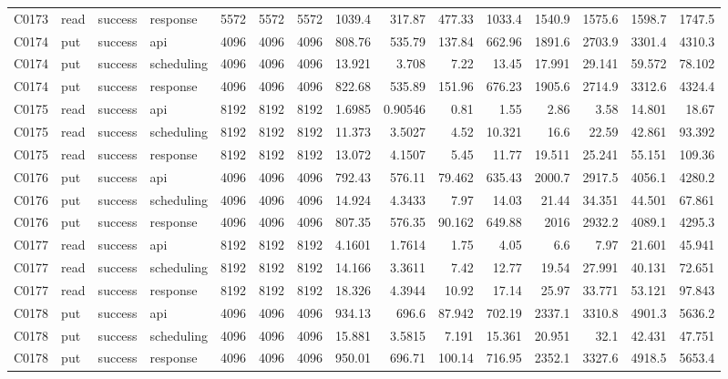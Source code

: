 \begin{landscape}
\begin{longtable}{llllrrrrrrrrrrr}
C0173 & read & success & response & 5572 & 5572 & 5572 & 1039.4 & 317.87 & 477.33 & 1033.4 & 1540.9 & 1575.6 & 1598.7 & 1747.5\\
C0174 & put & success & api & 4096 & 4096 & 4096 & 808.76 & 535.79 & 137.84 & 662.96 & 1891.6 & 2703.9 & 3301.4 & 4310.3\\
C0174 & put & success & scheduling & 4096 & 4096 & 4096 & 13.921 & 3.708 & 7.22 & 13.45 & 17.991 & 29.141 & 59.572 & 78.102\\
C0174 & put & success & response & 4096 & 4096 & 4096 & 822.68 & 535.89 & 151.96 & 676.23 & 1905.6 & 2714.9 & 3312.6 & 4324.4\\
C0175 & read & success & api & 8192 & 8192 & 8192 & 1.6985 & 0.90546 & 0.81 & 1.55 & 2.86 & 3.58 & 14.801 & 18.67\\
C0175 & read & success & scheduling & 8192 & 8192 & 8192 & 11.373 & 3.5027 & 4.52 & 10.321 & 16.6 & 22.59 & 42.861 & 93.392\\
C0175 & read & success & response & 8192 & 8192 & 8192 & 13.072 & 4.1507 & 5.45 & 11.77 & 19.511 & 25.241 & 55.151 & 109.36\\
C0176 & put & success & api & 4096 & 4096 & 4096 & 792.43 & 576.11 & 79.462 & 635.43 & 2000.7 & 2917.5 & 4056.1 & 4280.2\\
C0176 & put & success & scheduling & 4096 & 4096 & 4096 & 14.924 & 4.3433 & 7.97 & 14.03 & 21.44 & 34.351 & 44.501 & 67.861\\
C0176 & put & success & response & 4096 & 4096 & 4096 & 807.35 & 576.35 & 90.162 & 649.88 & 2016 & 2932.2 & 4089.1 & 4295.3\\
C0177 & read & success & api & 8192 & 8192 & 8192 & 4.1601 & 1.7614 & 1.75 & 4.05 & 6.6 & 7.97 & 21.601 & 45.941\\
C0177 & read & success & scheduling & 8192 & 8192 & 8192 & 14.166 & 3.3611 & 7.42 & 12.77 & 19.54 & 27.991 & 40.131 & 72.651\\
C0177 & read & success & response & 8192 & 8192 & 8192 & 18.326 & 4.3944 & 10.92 & 17.14 & 25.97 & 33.771 & 53.121 & 97.843\\
C0178 & put & success & api & 4096 & 4096 & 4096 & 934.13 & 696.6 & 87.942 & 702.19 & 2337.1 & 3310.8 & 4901.3 & 5636.2\\
C0178 & put & success & scheduling & 4096 & 4096 & 4096 & 15.881 & 3.5815 & 7.191 & 15.361 & 20.951 & 32.1 & 42.431 & 47.751\\
C0178 & put & success & response & 4096 & 4096 & 4096 & 950.01 & 696.71 & 100.14 & 716.95 & 2352.1 & 3327.6 & 4918.5 & 5653.4\\

\end{longtable}
\end{landscape}
